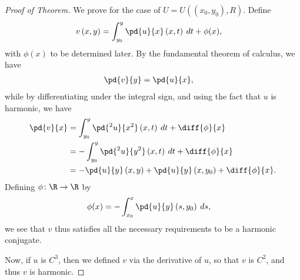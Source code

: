 \documentclass[10pt]{mypackage}
\begin{document}
\begin{proof}[Proof of Theorem]
  We prove for the case of $U = U\left( \left( x_0,y_0 \right),R \right)$. Define
  \begin{align*}
    v\left( x,y \right) &= \int_{y_0}^{y} \pd{u}{x}\left( x,t \right)\:dt + \phi(x),
  \end{align*}
  with $\phi(x)$ to be determined later. By the fundamental theorem of calculus, we have
  \begin{align*}
    \pd{v}{y} &= \pd{u}{x},
  \end{align*}
  while by differentiating under the integral sign, and using the fact that $u$ is harmonic, we have
  \begin{align*}
    \pd{v}{x} &= \int_{y_0}^{y} \pd{^2u}{x^2}\left( x,t \right)\:dt + \diff{\phi}{x}\\
              &= - \int_{y_0}^{y} \pd{^2u}{y^2}\left( x,t \right)\:dt + \diff{\phi}{x}\\
              &= - \pd{u}{y}\left( x,y \right) + \pd{u}{y}\left( x,y_0 \right) + \diff{\phi}{x}.
  \end{align*}
  Defining $\phi\colon \R\rightarrow \R$ by
  \begin{align*}
    \phi(x) &= -\int_{x_0}^{x} \pd{u}{y}\left( s,y_0 \right)\:ds,
  \end{align*}
  we see that $v$ thus satisfies all the necessary requirements to be a harmonic conjugate.\newline

  Now, if $u$ is $C^{3}$, then we defined $v$ via the derivative of $u$, so that $v$ is $C^{2}$, and thus $v$ is harmonic.
\end{proof}
\end{document}
